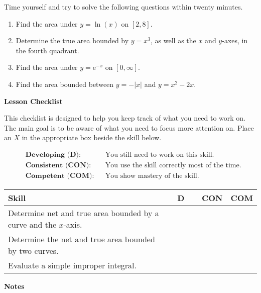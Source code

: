 \documentclass[10pt]{book}
\theoremstyle{definition}
\theoremstyle{remark}
\begin{document}
\begin{large}
\noindent
Time yourself and try to solve the following questions within twenty minutes. 
\begin{enumerate}
\item Find the area under $y = \ln(x)$ on $[2,8]$.\vfil
\item Determine the true area bounded by $y=x^3$, as well as the $x$ and $y$-axes, in the fourth quadrant.\vfil
\item Find the area under $y = \textrm{e}^{-x}$ on $[0,\infty]$.\vfil
\item Find the area bounded between $y = -|x|$ and $y = x^2-2x$.\vfil
\end{enumerate}

\noindent
\textbf{Lesson Checklist}
\bigskip

\noindent
This checklist is designed to help you keep track of what you need to work on. The main goal is to be aware of what you need to focus more attention on. Place an $X$ in the appropriate box beside the skill below. 
\bigskip

\noindent
\begin{align*}
&\textbf{Developing (D):} &&\textrm{You still need to work on this skill.}\\
&\textbf{Consistent (CON):} &&\textrm{You use the skill correctly most of the time.}\\
&\textbf{Competent (COM):} &&\textrm{You show mastery of the skill.} 
\end{align*}
\vfil

\begin{center}
\begin{tabular}{|l|l|l|l|}
\hline
\textbf{Skill} & \textbf{~~D~~} & \textbf{CON} & \textbf{COM} \\
\hline
Determine net and true area bounded by a curve and the $x$-axis.&&&\\
\hline
Determine the net and true area bounded by two curves.&&&\\
\hline
Evaluate a simple improper integral.&&&\\
\hline
\end{tabular}
\end{center}
\vfil

\noindent
\textbf{Notes}
\end{large} \vfil
\newpage

\end{document}
